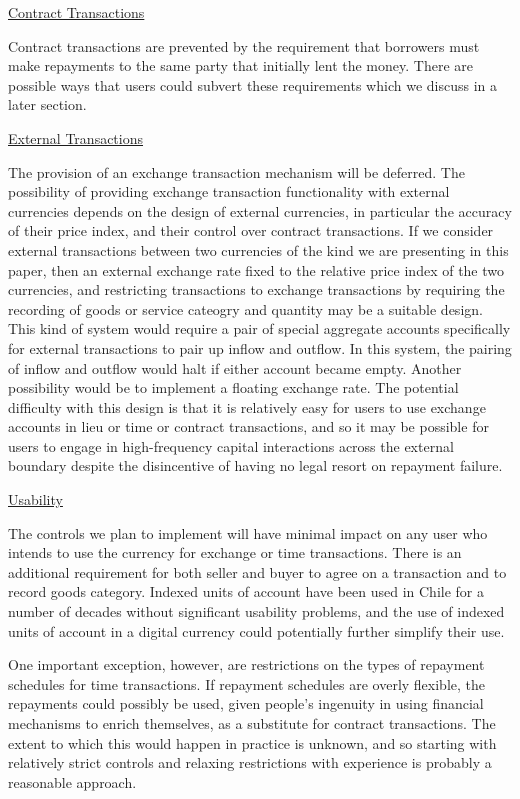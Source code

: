 \underline{Contract Transactions}

Contract transactions are prevented by the requirement that borrowers must make repayments to the
same party that initially lent the money. There are possible ways that users could subvert these
requirements which we discuss in a later section.

\underline{External Transactions}

The provision of an exchange transaction mechanism will be deferred. The possibility of providing
exchange transaction functionality with external currencies depends on the design of external
currencies, in particular the accuracy of their price index, and their control over contract
transactions. If we consider external transactions between two currencies of the kind we are
presenting in this paper, then an external exchange rate fixed to the relative price index of the
two currencies, and restricting transactions to exchange transactions by requiring the recording of
goods or service cateogry and quantity may be a suitable design. This kind of system would require a
pair of special aggregate accounts specifically for external transactions to pair up inflow and
outflow. In this system, the pairing of inflow and outflow would halt if either account became
empty. Another possibility would be to implement a floating exchange rate. The potential difficulty
with this design is that it is relatively easy for users to use exchange accounts in lieu or time or
contract transactions, and so it may be possible for users to engage in high-frequency capital
interactions across the external boundary despite the disincentive of having no legal resort on
repayment failure.

\underline{Usability}

The controls we plan to implement will have minimal impact on any user who intends to use the
currency for exchange or time transactions. There is an additional requirement for both seller and
buyer to agree on a transaction and to record goods category. Indexed units of account have been
used in Chile for a number of decades without significant usability problems, and the use of indexed
units of account in a digital currency could potentially further simplify their use.

One important exception, however, are restrictions on the types of repayment schedules for time
transactions. If repayment schedules are overly flexible, the repayments could possibly be used,
given people's ingenuity in using financial mechanisms to enrich themselves, as a substitute for
contract transactions. The extent to which this would happen in practice is unknown, and so starting
with relatively strict controls and relaxing restrictions with experience is probably a reasonable
approach.

